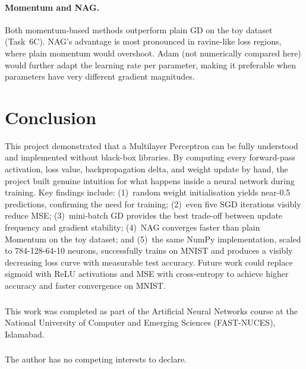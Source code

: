 \documentclass[runningheads]{llncs}
\begin{document}
\paragraph{Momentum and NAG.}
Both momentum-based methods outperform plain GD on the toy dataset (Task~6C).
NAG's advantage is most pronounced in ravine-like loss regions, where plain
momentum would overshoot. Adam (not numerically compared here) would further
adapt the learning rate per parameter, making it preferable when parameters
have very different gradient magnitudes.

\section{Conclusion}
\label{sec:conclusion}

This project demonstrated that a Multilayer Perceptron can be fully understood
and implemented without black-box libraries. By computing every forward-pass
activation, loss value, backpropagation delta, and weight update by hand, the
project built genuine intuition for what happens inside a neural network during
training. Key findings include: (1)~random weight initialisation yields near-0.5
predictions, confirming the need for training; (2)~even five SGD iterations
visibly reduce MSE; (3)~mini-batch GD provides the best trade-off between update
frequency and gradient stability; (4)~NAG converges faster than plain Momentum
on the toy dataset; and (5)~the same NumPy implementation, scaled to
784-128-64-10 neurons, successfully trains on MNIST and produces a visibly
decreasing loss curve with measurable test accuracy. Future work could replace
sigmoid with ReLU activations and MSE with cross-entropy to achieve higher
accuracy and faster convergence on MNIST.

\begin{credits}
\subsubsection{\ackname}
This work was completed as part of the Artificial Neural Networks course at the
National University of Computer and Emerging Sciences (FAST-NUCES), Islamabad.

\subsubsection{\discintname}
The author has no competing interests to declare.
\end{credits}
\end{document}
